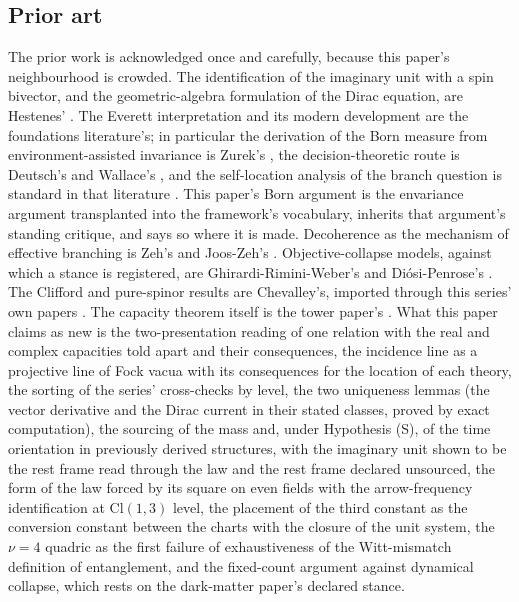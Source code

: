 \documentclass[11pt]{article}
\theoremstyle{definition}
\newcommand{\Cl}{\mathrm{Cl}}
\begin{document}
\subsection*{Prior art}

The prior work is acknowledged once and carefully, because this paper's neighbourhood is crowded. The identification of the imaginary unit with a spin bivector, and the geometric-algebra formulation of the Dirac equation, are Hestenes' \cite{Hestenes1967, Hestenes1975}. The Everett interpretation and its modern development are the foundations literature's; in particular the derivation of the Born measure from environment-assisted invariance is Zurek's \cite{Zurek2005}, the decision-theoretic route is Deutsch's and Wallace's \cite{Deutsch1999, Wallace2012}, and the self-location analysis of the branch question is standard in that literature \cite{Saunders2010}. This paper's Born argument is the envariance argument transplanted into the framework's vocabulary, inherits that argument's standing critique, and says so where it is made. Decoherence as the mechanism of effective branching is Zeh's and Joos-Zeh's \cite{Zeh1970, JoosZeh1985}. Objective-collapse models, against which a stance is registered, are Ghirardi-Rimini-Weber's and Di\'osi-Penrose's \cite{GRW1986, Penrose1996}. The Clifford and pure-spinor results are Chevalley's, imported through this series' own papers \cite{ButlerT1, ButlerT9}. The capacity theorem itself is the tower paper's \cite[Thm.~4.3]{ButlerT3}. What this paper claims as new is the two-presentation reading of one relation with the real and complex capacities told apart and their consequences, the incidence line as a projective line of Fock vacua with its consequences for the location of each theory, the sorting of the series' cross-checks by level, the two uniqueness lemmas (the vector derivative and the Dirac current in their stated classes, proved by exact computation), the sourcing of the mass and, under Hypothesis (S), of the time orientation in previously derived structures, with the imaginary unit shown to be the rest frame read through the law and the rest frame declared unsourced, the form of the law forced by its square on even fields with the arrow-frequency identification at $\Cl(1,3)$ level, the placement of the third constant as the conversion constant between the charts with the closure of the unit system, the $\nu = 4$ quadric as the first failure of exhaustiveness of the Witt-mismatch definition of entanglement, and the fixed-count argument against dynamical collapse, which rests on the dark-matter paper's declared stance.
\end{document}
